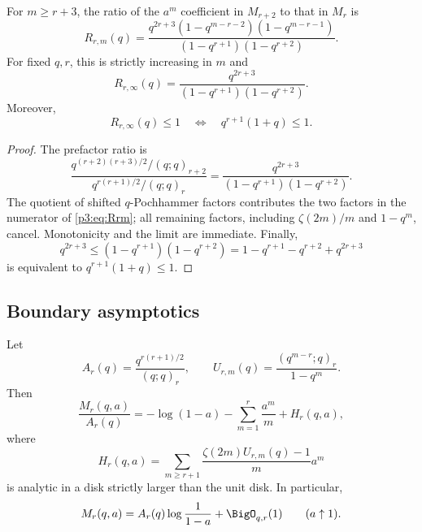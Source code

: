 \documentclass[11pt]{article}
\numberwithin{equation}{section}
\theoremstyle{definition}
\theoremstyle{remark}
\begin{document}
\begin{lemma}\label{p3:lem:coefficient-ratio}
For $m\ge r+3$, the ratio of the $a^m$ coefficient in $M_{r+2}$ to that in $M_r$ is
\begin{equation}
 R_{r,m}(q)=
 \frac{q^{2r+3}(1-q^{m-r-2})(1-q^{m-r-1})}
 {(1-q^{r+1})(1-q^{r+2})}.
 \label{p3:eq:Rrm}
\end{equation}
For fixed $q,r$, this is strictly increasing in $m$ and
\begin{equation}
 R_{r,\infty}(q)=
 \frac{q^{2r+3}}{(1-q^{r+1})(1-q^{r+2})}.
 \label{p3:eq:Rinfty}
\end{equation}
Moreover,
\begin{equation}
 R_{r,\infty}(q)\le1
 \quad\Longleftrightarrow\quad q^{r+1}(1+q)\le1.
 \label{p3:eq:threshold-equivalence}
\end{equation}
\end{lemma}

\begin{proof}
The prefactor ratio is
\[
 \frac{q^{(r+2)(r+3)/2}/(q;q)_{r+2}}
      {q^{r(r+1)/2}/(q;q)_r}
 =\frac{q^{2r+3}}{(1-q^{r+1})(1-q^{r+2})}.
\]
The quotient of shifted $q$-Pochhammer factors contributes the two factors in the numerator
of \eqref{p3:eq:Rrm}; all remaining factors, including $\zeta(2m)/m$ and $1-q^m$, cancel.
Monotonicity and the limit are immediate.  Finally,
\[
 q^{2r+3}\le(1-q^{r+1})(1-q^{r+2})
 =1-q^{r+1}-q^{r+2}+q^{2r+3}
\]
is equivalent to $q^{r+1}(1+q)\le1$.
\end{proof}

\subsection{Boundary asymptotics}

\begin{lemma}\label{p3:lem:boundary-decomp}
Let
\[
 A_r(q)=\frac{q^{r(r+1)/2}}{(q;q)_r},\qquad
 U_{r,m}(q)=\frac{(q^{m-r};q)_r}{1-q^m}.
\]
Then
\begin{equation}
 \frac{M_r(q,a)}{A_r(q)}
 =-\log(1-a)-\sum_{m=1}^{r}\frac{a^m}{m}
 +H_r(q,a),
 \label{p3:eq:accelerated-M}
\end{equation}
where
\begin{equation}
 H_r(q,a)=\sum_{m\ge r+1}
 \frac{\zeta(2m)U_{r,m}(q)-1}{m}a^m
 \label{p3:eq:Hr}
\end{equation}
is analytic in a disk strictly larger than the unit disk.  In particular,
\begin{equation}
 M_r(q,a)=A_r(q)\log\frac1{1-a}+\BigO_{q,r}(1)
 \qquad(a\uparrow1).
 \label{p3:eq:Mr-boundary}
\end{equation}
\end{lemma}
\end{document}
